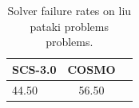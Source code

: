 \begin{table}
\centering
\caption{Solver failure rates on liu pataki problems problems.}
\label{t-liu pataki problems-failure}
\begin{tabular}{lcc}
\toprule
 SCS-3.0 &  COSMO \\
\midrule
   44.50 &  56.50 \\
\bottomrule
\end{tabular}
\end{table}
